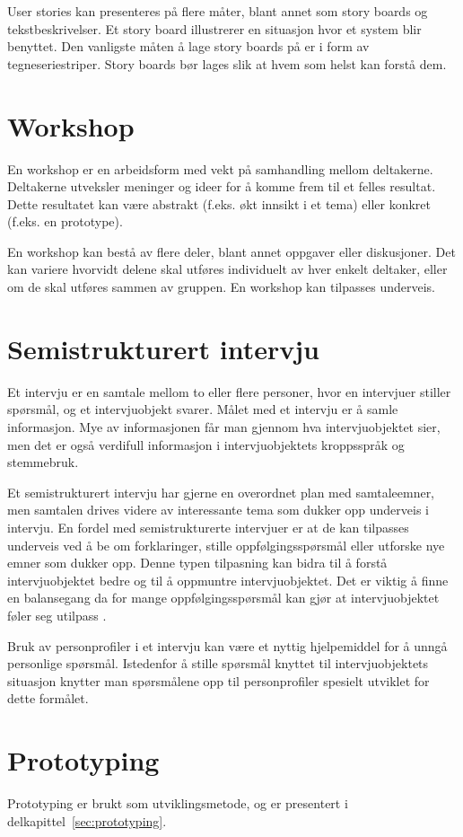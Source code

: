 User stories kan presenteres på flere måter, blant annet som story boards og tekstbeskrivelser. Et story board illustrerer en situasjon hvor et system blir benyttet. Den vanligste måten å lage story boards på er i form av tegneseriestriper. Story boards bør lages slik at hvem som helst kan forstå dem. 

\section{Workshop}
En workshop er en arbeidsform med vekt på samhandling mellom deltakerne. Deltakerne utveksler meninger og ideer for å komme frem til et felles resultat. Dette resultatet kan være abstrakt (f.eks. økt innsikt i et tema) eller konkret (f.eks. en prototype).

En workshop kan bestå av flere deler, blant annet oppgaver eller diskusjoner. Det kan variere hvorvidt delene skal utføres individuelt av hver enkelt deltaker, eller om de skal utføres sammen av gruppen. En workshop kan tilpasses underveis.

\section{Semistrukturert intervju}
Et intervju er en samtale mellom to eller flere personer, hvor en intervjuer stiller spørsmål, og et intervjuobjekt svarer. Målet med et intervju er å samle informasjon. Mye av informasjonen får man gjennom hva intervjuobjektet sier, men det er også verdifull informasjon i intervjuobjektets kroppsspråk og stemmebruk. 

Et semistrukturert intervju har gjerne en overordnet plan med samtaleemner, men samtalen drives videre av interessante tema som dukker opp underveis i intervju. En fordel med semistrukturerte intervjuer er at de kan tilpasses underveis ved å be om forklaringer, stille oppfølgingsspørsmål eller utforske nye emner som dukker opp. Denne typen tilpasning kan bidra til å forstå intervjuobjektet bedre og til å oppmuntre intervjuobjektet. Det er viktig å finne en balansegang da for mange oppfølgingsspørsmål kan gjør at intervjuobjektet føler seg utilpass \citep{Seidman}.

Bruk av personprofiler i et intervju kan være et nyttig hjelpemiddel for å unngå personlige spørsmål. Istedenfor å stille spørsmål knyttet til intervjuobjektets situasjon knytter man spørsmålene opp til personprofiler spesielt utviklet for dette formålet.

\section{Prototyping}
Prototyping er brukt som utviklingsmetode, og er presentert i delkapittel~\ref{sec:prototyping}.